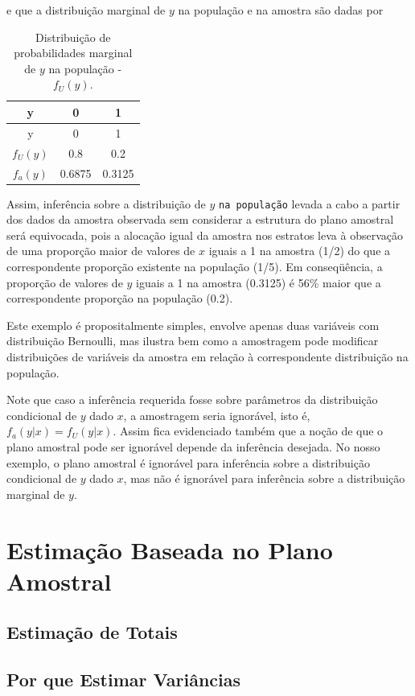 \documentclass[]{book}
\theoremstyle{definition}
\theoremstyle{definition}
\theoremstyle{definition}
\theoremstyle{remark}
\begin{document}
e que a distribuição marginal de \(y\) na população e na amostra são
dadas por

\begin{longtable}[]{@{}ccc@{}}
\caption{\label{tab:Tab28} Distribuição de probabilidades marginal de \(y\)
na população - \(f_U( y )\).}\tabularnewline
\toprule
y & 0 & 1\tabularnewline
\midrule
\endfirsthead
\toprule
y & 0 & 1\tabularnewline
\midrule
\endhead
\(f_U(y)\) & 0.8 & 0.2\tabularnewline
\(f_a(y)\) & 0.6875 & 0.3125\tabularnewline
\bottomrule
\end{longtable}

Assim, inferência sobre a distribuição de \(y\) \texttt{na\ população}
levada a cabo a partir dos dados da amostra observada sem considerar a
estrutura do plano amostral será equivocada, pois a alocação igual da
amostra nos estratos leva à observação de uma proporção maior de valores
de \(x\) iguais a 1 na amostra (1/2) do que a correspondente proporção
existente na população (1/5). Em conseqüência, a proporção de valores de
\(y\) iguais a 1 na amostra (0.3125) é 56\% maior que a correspondente
proporção na população (0.2).

Este exemplo é propositalmente simples, envolve apenas duas variáveis
com distribuição Bernoulli, mas ilustra bem como a amostragem pode
modificar distribuições de variáveis da amostra em relação à
correspondente distribuição na população.

Note que caso a inferência requerida fosse sobre parâmetros da
distribuição condicional de \(y\) dado \(x\), a amostragem seria
ignorável, isto é, \(f_a ( y | x) = f_U (y | x)\). Assim fica
evidenciado também que a noção de que o plano amostral pode ser
ignorável depende da inferência desejada. No nosso exemplo, o plano
amostral é ignorável para inferência sobre a distribuição condicional de
\(y\) dado \(x\), mas não é ignorável para inferência sobre a
distribuição marginal de \(y\).

\chapter{Estimação Baseada no Plano Amostral}\label{capplanamo}

\section{Estimação de Totais}\label{estimatotais}

\section{Por que Estimar Variâncias}\label{por-que-estimar-variancias}
\end{document}
